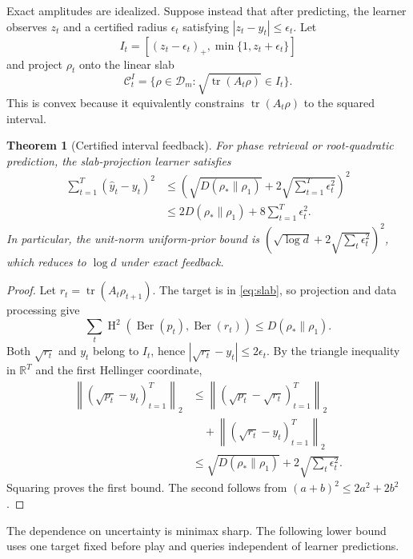 \documentclass[twoside]{article}
\newtheorem{theorem}{Theorem}
\newcommand{\Dens}{\mathcal D}
\newcommand{\C}{\mathcal C}
\newcommand{\tr}{\operatorname{tr}}
\newcommand{\Hsq}{\operatorname{H}^2}
\newcommand{\Ber}{\operatorname{Ber}}
\begin{document}
Exact amplitudes are idealized. Suppose instead that after predicting, the learner observes $z_t$ and a certified radius $\epsilon_t$ satisfying $|z_t-y_t|\leq\epsilon_t$. Let
\begin{equation}
I_t=[(z_t-\epsilon_t)_+,\min\{1,z_t+\epsilon_t\}]
\end{equation}
and project $\rho_t$ onto the linear slab
\begin{equation}
\C_t^{I}=\{\rho\in\Dens_m:\sqrt{\tr(A_t\rho)}\in I_t\}.
\label{eq:slab}
\end{equation}
This is convex because it equivalently constrains $\tr(A_t\rho)$ to the squared interval.

\begin{theorem}[Certified interval feedback]
\label{thm:robust}
For phase retrieval or root-quadratic prediction, the slab-projection learner satisfies
\begin{align}
\sum_{t=1}^T(\widehat y_t-y_t)^2
&\leq\left(\sqrt{D(\rho_*\|\rho_1)}+2\sqrt{\sum_{t=1}^T\epsilon_t^2}\right)^2\nonumber\\
&\leq2D(\rho_*\|\rho_1)+8\sum_{t=1}^T\epsilon_t^2.
\label{eq:robust-bound}
\end{align}
In particular, the unit-norm uniform-prior bound is $(\sqrt{\log d}+2\sqrt{\sum_t\epsilon_t^2})^2$, which reduces to $\log d$ under exact feedback.
\end{theorem}

\begin{proof}
Let $r_t=\tr(A_t\rho_{t+1})$. The target is in \eqref{eq:slab}, so projection and data processing give
\begin{equation}
\sum_t\Hsq(\Ber(p_t),\Ber(r_t))\leq D(\rho_*\|\rho_1).
\end{equation}
Both $\sqrt{r_t}$ and $y_t$ belong to $I_t$, hence $|\sqrt{r_t}-y_t|\leq2\epsilon_t$. By the triangle inequality in $\mathbb R^T$ and the first Hellinger coordinate,
\begin{align}
\left\|(\sqrt{p_t}-y_t)_{t=1}^T\right\|_2
&\leq\left\|(\sqrt{p_t}-\sqrt{r_t})_{t=1}^T\right\|_2\nonumber\\
&\quad+\left\|(\sqrt{r_t}-y_t)_{t=1}^T\right\|_2\\
&\leq\sqrt{D(\rho_*\|\rho_1)}+2\sqrt{\sum_t\epsilon_t^2}.
\end{align}
Squaring proves the first bound. The second follows from $(a+b)^2\leq2a^2+2b^2$.
\end{proof}

The dependence on uncertainty is minimax sharp. The following lower bound uses one target fixed before play and queries independent of learner predictions.
\end{document}
